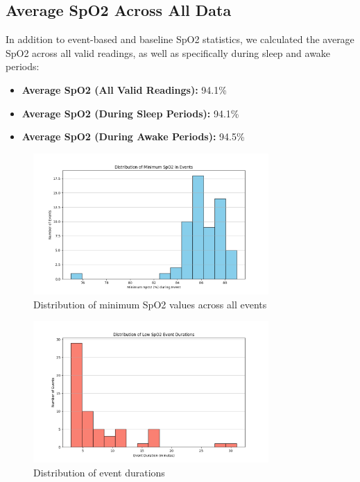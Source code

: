 \documentclass{article}
\begin{document}
\subsection{Average SpO2 Across All Data}
In addition to event-based and baseline SpO2 statistics, we calculated the average SpO2 across all valid readings, as well as specifically during sleep and awake periods:
\begin{itemize}
    \item \textbf{Average SpO2 (All Valid Readings):} 94.1\%
    \item \textbf{Average SpO2 (During Sleep Periods):} 94.1\%
    \item \textbf{Average SpO2 (During Awake Periods):} 94.5\%
\end{itemize}

\begin{figure}[htbp]
    \centering
    \includegraphics[width=0.8\textwidth]{images/_overall_min_spo2_distribution.png}
    \caption{Distribution of minimum SpO2 values across all events}
    \label{fig:spo2_dist}
\end{figure}

\begin{figure}[htbp]
    \centering
    \includegraphics[width=0.8\textwidth]{images/_overall_event_duration_distribution.png}
    \caption{Distribution of event durations}
    \label{fig:duration_dist}
\end{figure}
\end{document}
